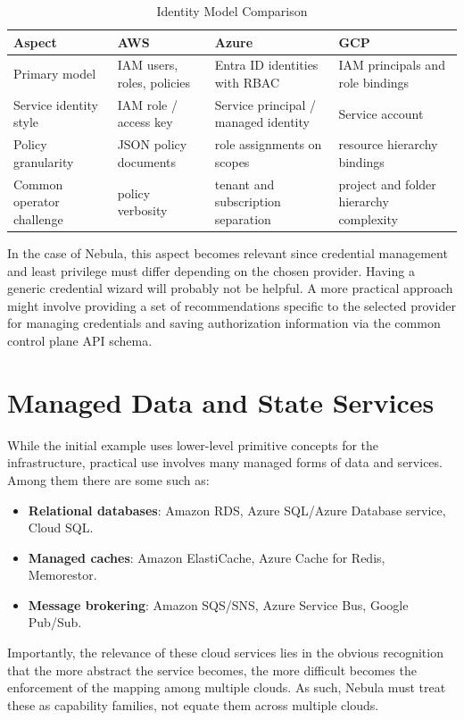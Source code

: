 \begin{table}[H]
\centering
\caption{Identity Model Comparison}
\label{tab:identity_compare}
\begin{tabular}{|p{2.6cm}|p{3.0cm}|p{3.0cm}|p{3.0cm}|}
\hline
\textbf{Aspect} & \textbf{AWS} & \textbf{Azure} & \textbf{GCP} \\ \hline
Primary model & IAM users, roles, policies & Entra ID identities with RBAC & IAM principals and role bindings \\ \hline
Service identity style & IAM role / access key & Service principal / managed identity & Service account \\ \hline
Policy granularity & JSON policy documents & role assignments on scopes & resource hierarchy bindings \\ \hline
Common operator challenge & policy verbosity & tenant and subscription separation & project and folder hierarchy complexity \\ \hline
\end{tabular}
\end{table}

In the case of Nebula, this aspect becomes relevant since credential management and least privilege must differ depending on the chosen provider. Having a generic credential wizard will probably not be helpful. A more practical approach might involve providing a set of recommendations specific to the selected provider for managing credentials and saving authorization information via the common control plane API schema.


\section{Managed Data and State Services}
While the initial example uses lower-level primitive concepts for the infrastructure, practical use involves many managed forms of data and services. Among them there are some such as:


\begin{itemize}
    \item \textbf{Relational databases}: Amazon RDS, Azure SQL/Azure Database service, Cloud SQL.
    \item \textbf{Managed caches}: Amazon ElastiCache, Azure Cache for Redis, Memorestor.
    \item \textbf{Message brokering}: Amazon SQS/SNS, Azure Service Bus, Google Pub/Sub.
\end{itemize}

Importantly, the relevance of these cloud services lies in the obvious recognition that the more abstract the service becomes, the more difficult becomes the enforcement of the mapping among multiple clouds. As such, Nebula must treat these as capability families, not equate them across multiple clouds.

